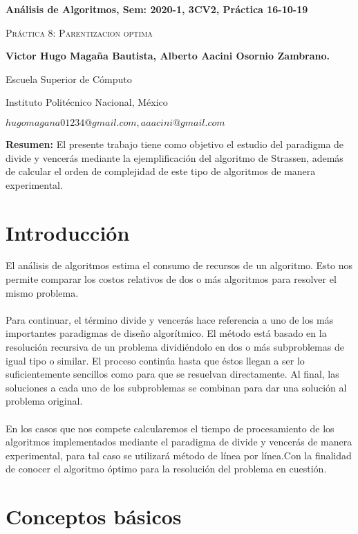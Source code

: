 \documentclass[12pt,twoside]{article}
\date{}
\begin{document}
\centerline{\bf An\'alisis de Algoritmos, Sem: 2020-1, 3CV2, Práctica 16-10-19}
\centerline{}
\centerline{}
\begin{center}
\Large{\textsc{Pr\'actica 8: Parentizacion optima}}
\end{center}
\centerline{}
\centerline{\bf {Victor Hugo Magaña Bautista, Alberto Aacini Osornio Zambrano.}}
\centerline{}
\centerline{Escuela Superior de Cómputo}
\centerline{Instituto Politécnico Nacional, México}
\centerline{$hugomagana01234@gmail.com, aaacini@gmail.com$}
\newtheorem{Theorem}{\quad Theorem}[section]
\newtheorem{Definition}[Theorem]{\quad Definition}
\newtheorem{Corollary}[Theorem]{\quad Corollary}
\newtheorem{Lemma}[Theorem]{\quad Lemma}
\newtheorem{Example}[Theorem]{\quad Example}
\bigskip
\textbf{Resumen:} El presente trabajo tiene como objetivo el estudio del paradigma de divide y vencerás mediante la ejemplificación del algoritmo de Strassen, además de calcular el orden de complejidad de este tipo de algoritmos de manera experimental.
\section{Introducción}
     El análisis de algoritmos estima el consumo de recursos de un algoritmo.  Esto nos permite comparar los costos relativos de dos o más algoritmos para resolver el mismo problema. \\ \\
     Para continuar, el término divide y vencerás hace referencia a uno de los más importantes paradigmas de diseño algorítmico. El método está basado en la resolución recursiva de un problema dividiéndolo en dos o más subproblemas de igual tipo o similar. El proceso continúa hasta que éstos llegan a ser lo suficientemente sencillos como para que se resuelvan directamente. Al final, las soluciones a cada uno de los subproblemas se combinan para dar una solución al problema original.
     \\ \\
     En los casos que nos compete calcularemos el tiempo de procesamiento de los algoritmos implementados mediante el paradigma de divide y vencerás de manera experimental, para tal caso se utilizará método de línea por línea.Con la finalidad de conocer el algoritmo óptimo para la resolución del problema en cuestión.
     
\section{Conceptos básicos}
\end{document}
